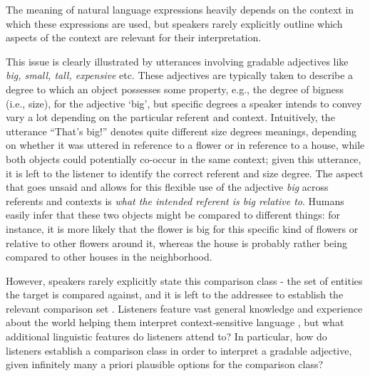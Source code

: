 The meaning of natural language expressions heavily depends on the context in which these expressions are used, but speakers rarely explicitly outline which aspects of the context are relevant for their interpretation. 

This issue is clearly illustrated by utterances involving gradable adjectives like \textit{big, small, tall, expensive} etc. These adjectives are typically taken to describe a degree to which an object possesses some property, e.g., the degree of bigness (i.e., size), for the adjective ‘big’, but specific degrees a speaker intends to convey vary a lot depending on the particular referent and context. Intuitively, the utterance “That’s big!” denotes quite different size degrees meanings, depending on whether it was uttered in reference to a flower or in reference to a house, while both objects could potentially co-occur in the same context; given this utterance, it is left to the listener to identify the correct referent and size degree. The aspect that goes unsaid and allows for this flexible use of the adjective \textit{big} across referents and contexts is \textit{what the intended referent is big relative to}. Humans easily infer that these two objects might be compared to different things: for instance, it is more likely that the flower is big for this specific kind of flowers or relative to other flowers around it, whereas the house is probably rather being compared to other houses in the neighborhood. 

However, speakers rarely explicitly state this comparison class - the set of entities the target is compared against, and it is left to the addressee to establish the relevant comparison set \parencite{Solt2009}. Listeners feature vast general knowledge and experience about the world helping them interpret context-sensitive language \parencite{tessler2017warm}, but what additional linguistic features do listeners attend to? In particular, how do listeners establish a comparison class in order to interpret a gradable adjective, given infinitely many a priori plausible options for the comparison class? 


